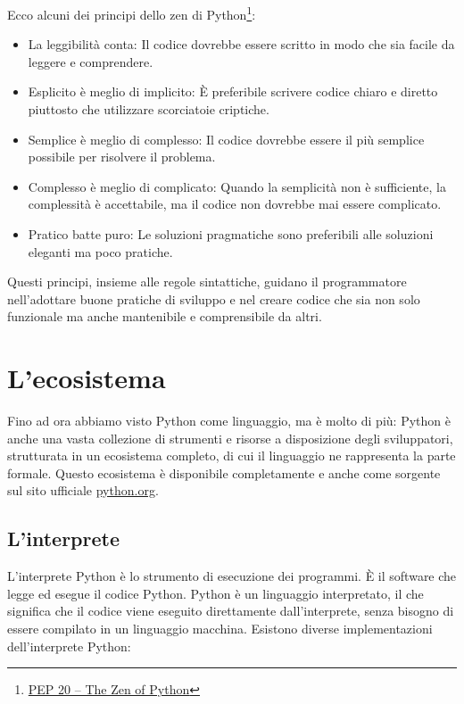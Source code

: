 \documentclass[
  letterpaper,
]{scrbook}
\providecommand{\tightlist}{%
  \setlength{\itemsep}{0pt}\setlength{\parskip}{0pt}}\usepackage{longtable,booktabs,array}
\begin{document}
Ecco alcuni dei principi dello zen di Python\footnote{\href{https://peps.python.org/pep-0020/}{PEP
  20 -- The Zen of Python}}:

\begin{itemize}
\tightlist
\item
  La leggibilità conta: Il codice dovrebbe essere scritto in modo che
  sia facile da leggere e comprendere.
\item
  Esplicito è meglio di implicito: È preferibile scrivere codice chiaro
  e diretto piuttosto che utilizzare scorciatoie criptiche.
\item
  Semplice è meglio di complesso: Il codice dovrebbe essere il più
  semplice possibile per risolvere il problema.
\item
  Complesso è meglio di complicato: Quando la semplicità non è
  sufficiente, la complessità è accettabile, ma il codice non dovrebbe
  mai essere complicato.
\item
  Pratico batte puro: Le soluzioni pragmatiche sono preferibili alle
  soluzioni eleganti ma poco pratiche.
\end{itemize}

Questi principi, insieme alle regole sintattiche, guidano il
programmatore nell'adottare buone pratiche di sviluppo e nel creare
codice che sia non solo funzionale ma anche mantenibile e comprensibile
da altri.

\section{L'ecosistema}\label{lecosistema}

Fino ad ora abbiamo visto Python come linguaggio, ma è molto di più:
Python è anche una vasta collezione di strumenti e risorse a
disposizione degli sviluppatori, strutturata in un ecosistema completo,
di cui il linguaggio ne rappresenta la parte formale. Questo ecosistema
è disponibile completamente e anche come sorgente sul sito ufficiale
\href{https://www.python.org/}{python.org}.

\subsection{L'interprete}\label{linterprete}

L'interprete Python è lo strumento di esecuzione dei programmi. È il
software che legge ed esegue il codice Python. Python è un linguaggio
interpretato, il che significa che il codice viene eseguito direttamente
dall'interprete, senza bisogno di essere compilato in un linguaggio
macchina. Esistono diverse implementazioni dell'interprete Python:
\end{document}
